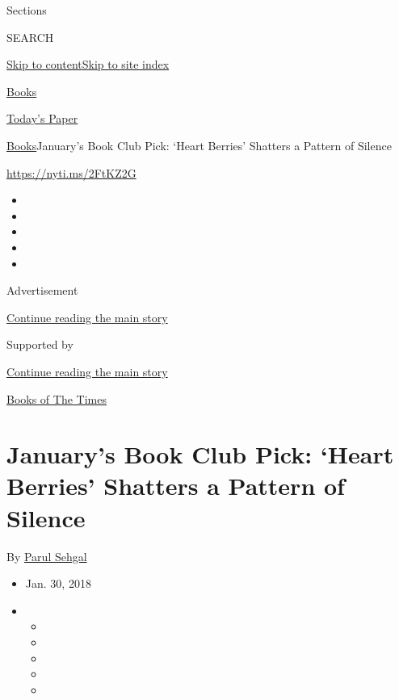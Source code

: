 Sections

SEARCH

\protect\hyperlink{site-content}{Skip to
content}\protect\hyperlink{site-index}{Skip to site index}

\href{https://www.nytimes3xbfgragh.onion/section/books}{Books}

\href{https://myaccount.nytimes3xbfgragh.onion/auth/login?response_type=cookie\&client_id=vi}{}

\href{https://www.nytimes3xbfgragh.onion/section/todayspaper}{Today's
Paper}

\href{/section/books}{Books}\textbar{}January's Book Club Pick: `Heart
Berries' Shatters a Pattern of Silence

\url{https://nyti.ms/2FtKZ2G}

\begin{itemize}
\item
\item
\item
\item
\item
\end{itemize}

Advertisement

\protect\hyperlink{after-top}{Continue reading the main story}

Supported by

\protect\hyperlink{after-sponsor}{Continue reading the main story}

\href{/column/books-of-the-times}{Books of The Times}

\hypertarget{januarys-book-club-pick-heart-berries-shatters-a-pattern-of-silence}{%
\section{January's Book Club Pick: `Heart Berries' Shatters a Pattern of
Silence}\label{januarys-book-club-pick-heart-berries-shatters-a-pattern-of-silence}}

By \href{https://www.nytimes3xbfgragh.onion/by/parul-sehgal}{Parul
Sehgal}

\begin{itemize}
\item
  Jan. 30, 2018
\item
  \begin{itemize}
  \item
  \item
  \item
  \item
  \item
  \end{itemize}
\end{itemize}

